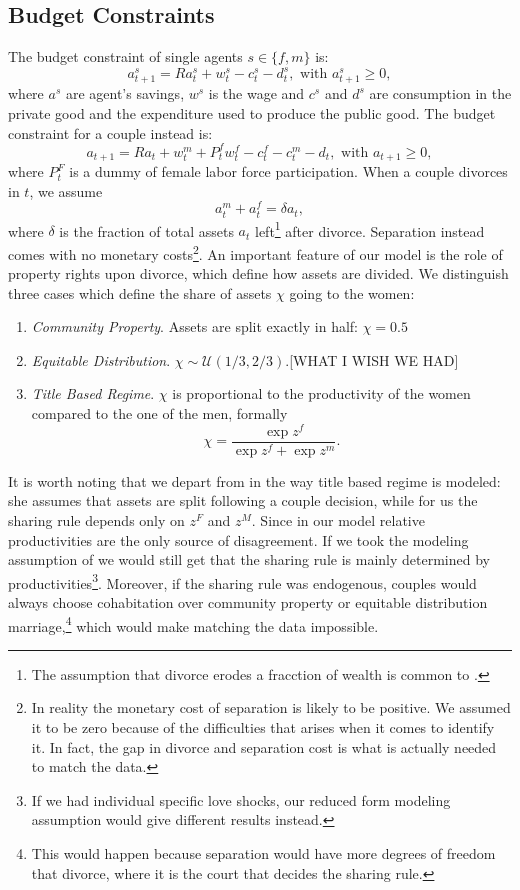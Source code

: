 \documentclass[12pt]{article}
\numberwithin{table}{section}
\begin{document}
\subsection{Budget Constraints}
The budget constraint of single agents  $s\in\{f,m\}$ is:
\begin{equation}\label{eq:bcs}
a^s_{t+1}=R a^s_t+w^s_t-c^s_t-d^s_t, \text{ with }a^s_{t+1}\geq0,
\end{equation}
where $a^s$ are agent's savings, $w^s$ is the wage and $c^s$ and $d^s$ are consumption in the private good and the expenditure used to produce the public good.
The budget constraint for a couple instead is:
\begin{equation}\label{eq:bcm}
a_{t+1}=R a_t+w^m_t+P^f_t w^f_t-c^f_t-c^m_t-d_t, \text{ with }a_{t+1}\geq0,
\end{equation}
where $P^F_t$ is a dummy of female labor force participation.
When a couple divorces in $t$, we assume 
\[a^m_t+a^f_t=\delta a_t,\]
where $\delta$ is the fraction of total assets $a_t$ left\footnote{The assumption that divorce erodes a fracction of wealth is common to \cite{cubeddu2003}.} after divorce. Separation instead comes with no monetary costs\footnote{In reality the monetary cost of separation is likely to be positive. We assumed it to be zero because of the difficulties that arises when it comes to identify it. In fact, the gap in divorce and separation cost is what is actually needed to match the data.}.
An important feature of our model is the role of property rights upon divorce, which define how assets are divided. We distinguish three cases which define the share of assets $\chi$ going to the women:
\begin{enumerate}
\item \textit{Community Property}. Assets are split exactly in half: $\chi=0.5$
\item \textit{Equitable Distribution}. $\chi\sim\mathcal{U}(1/3,2/3)$.[WHAT I WISH WE HAD]
\item \textit{Title Based Regime}. $\chi$ is proportional to the productivity of the women compared to the one of the men, formally
\[\chi=\frac{\exp{z^f}}{\exp{z^f}+\exp{z^m}}.\]
\end{enumerate}
It is worth noting that we depart from \cite{voena2015} in the way title based regime is modeled: she assumes that assets are split following a couple decision, while for us the sharing rule depends only on $z^F$ and $z^M$. Since in our model relative productivities are the only source of disagreement. If we took the modeling assumption of \cite{voena2015} we would still get that the sharing rule is mainly determined by productivities\footnote{If we had individual specific love shocks, our reduced form modeling assumption would give different results instead.}. Moreover, if the sharing rule was endogenous, couples would always choose cohabitation over community property or equitable distribution marriage,\footnote{This would happen because separation would have more degrees of freedom that divorce, where it is the court that decides the sharing rule.} which would make matching the data impossible.  
\end{document}
